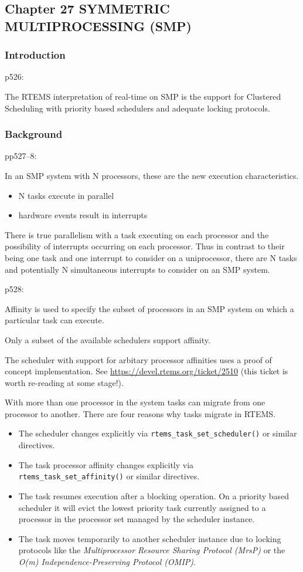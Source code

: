\subsection{Chapter 27 SYMMETRIC MULTIPROCESSING (SMP)}

\subsubsection{Introduction}

p526:

The RTEMS interpretation of real-time on SMP
is the support for Clustered Scheduling
with priority based schedulers and adequate locking protocols.

\subsubsection{Background}

pp527--8:

In an SMP system with N processors,
these are the new execution characteristics.
\begin{itemize}
  \item N tasks execute in parallel
  \item hardware events result in interrupts
\end{itemize}
There is true parallelism with a task executing on each processor
and the possibility of interrupts occurring on each processor.
Thus in contrast to their being one task and one interrupt
to consider on a uniprocessor,
there are N tasks and potentially N simultaneous interrupts
to consider on an SMP system.

p528:

Affinity is used to specify the subset of processors
in an SMP system on which a particular task can execute.

Only a subset of the available schedulers support affinity.

The scheduler with support for arbitary processor affinities
uses a proof of concept implementation.
See \url{https://devel.rtems.org/ticket/2510}
(this ticket is worth re-reading at some stage!).

With more than one processor in the system tasks can migrate from one processor to another.
There are four reasons why tasks migrate in RTEMS.
\begin{itemize}
  \item
    The scheduler changes explicitly
    via \verb"rtems_task_set_scheduler()" or similar directives.
  \item
    The task processor affinity changes explicitly
    via \verb"rtems_task_set_affinity()" or similar directives.
  \item
    The task resumes execution after a blocking operation.
    On a priority based scheduler it will evict
    the lowest priority task
    currently assigned to a processor in the processor set
    managed by the scheduler instance.
  \item
    The task moves temporarily to another scheduler instance
    due to locking protocols like
    the \emph{Multiprocessor Resource Sharing Protocol (MrsP)}
    or the \emph{O(m) Independence-Preserving Protocol (OMIP)}.
\end{itemize}

